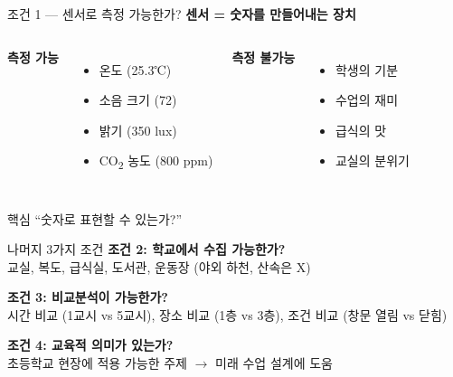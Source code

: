 \documentclass[10pt, aspectratio=169]{beamer}
\newcommand{\COtwo}{CO\textsubscript{2}}
\begin{document}
\begin{frame}{조건 1 --- 센서로 측정 가능한가?}
\textbf{센서 = 숫자를 만들어내는 장치}

\vspace{4mm}
\begin{columns}[T]
\textbf{측정 가능}
\begin{itemize}
  \item 온도 (25.3℃)
  \item 소음 크기 (72)
  \item 밝기 (350 lux)
  \item \COtwo{} 농도 (800 ppm)
\end{itemize}

\textbf{측정 불가능}
\begin{itemize}
  \item 학생의 기분
  \item 수업의 재미
  \item 급식의 맛
  \item 교실의 분위기
\end{itemize}
\end{columns}

\vfill
\begin{block}{핵심}
``숫자로 표현할 수 있는가?''
\end{block}
\end{frame}

\begin{frame}{나머지 3가지 조건}
\textbf{조건 2: 학교에서 수집 가능한가?}\\
교실, 복도, 급식실, 도서관, 운동장 (야외 하천, 산속은 X)

\vspace{4mm}
\textbf{조건 3: 비교{\textperiodcentered}분석이 가능한가?}\\
시간 비교 (1교시 vs 5교시), 장소 비교 (1층 vs 3층), 조건 비교 (창문 열림 vs 닫힘)

\vspace{4mm}
\textbf{조건 4: 교육적 의미가 있는가?}\\
초등학교 현장에 적용 가능한 주제 $\rightarrow$ 미래 수업 설계에 도움
\end{frame}
\end{document}
